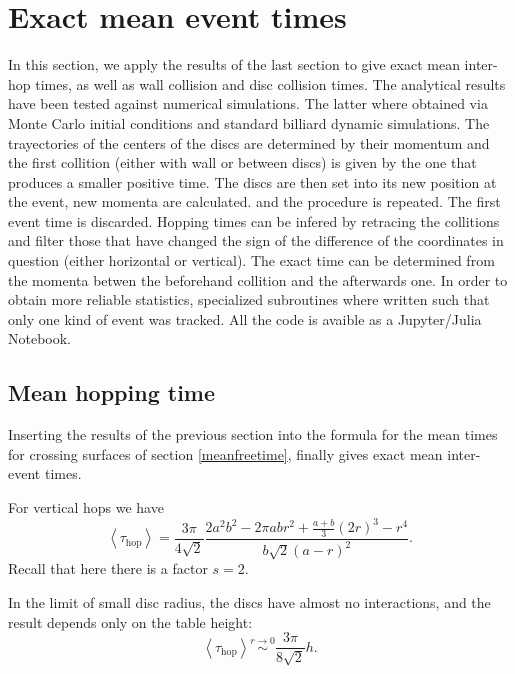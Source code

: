 \documentclass[superscriptaddress,pre,reprint,showpacs,twocolumn]{revtex4-1}
\newcommand{\mean}[1]{\left \langle #1 \right \rangle}
\begin{document}
\section{Exact mean event times}

In this section, we apply the results of the last section to give
exact mean inter-hop times, as well as wall collision and disc collision times.
The analytical results have been tested against numerical simulations.
The latter where obtained via Monte Carlo initial conditions and standard
billiard dynamic simulations. The trayectories of the centers of the
discs are determined by their momentum and the first collition
(either with wall or between discs) is given by
the one that produces a smaller positive time. The discs are then set into its new
position at the event, new momenta are calculated.
and the procedure is repeated. The first event time is discarded. Hopping
times can be infered by retracing the collitions and filter those that have
changed the sign of the difference of the coordinates in question (either
horizontal or vertical). The exact time can be determined from
the momenta betwen the beforehand collition and the afterwards one.
In order to
obtain more reliable statistics, specialized subroutines where written
such that only one kind of event was tracked. 
All the code is avaible as a Jupyter/Julia Notebook. 


\subsection{Mean hopping time}

 
Inserting the results of the previous section 
into the formula for the mean times for crossing
surfaces of section \eqref{meanfreetime}, finally gives exact mean inter-event times.

For vertical
hops we have
\begin{equation}\label{hoptau}
 \mean{\tau_\text{hop}} = 	
\frac{3 \pi}{4\sqrt{2}}
\frac{2 a^{2} b^{2}  - 2 \pi a b r^{2} + \textstyle \frac{a+b}{3}  (2r)^{3}  -  r^4}
{ b \sqrt{2}  ( a - r )^2}.
\end{equation}
Recall that here there is a factor $s = 2$.

In the limit of small disc radius, the discs have almost no interactions, and the result depends only
on the table height:
\begin{equation}\label{hoptaulimit}
 \mean{\tau_\text{hop}} \overset{r \to 0}{\sim}
\frac{3 \pi}{8\sqrt{2}}h.
\end{equation}
\end{document}
